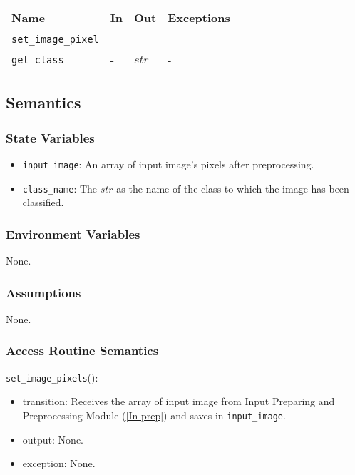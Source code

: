 \documentclass[12pt, titlepage]{article}
\def\code#1{\texttt{#1}}
\begin{document}
\begin{center}
\begin{tabular}{p{3cm} p{4cm} p{4cm} p{2cm}}
\hline
\textbf{Name} & \textbf{In} & \textbf{Out} & \textbf{Exceptions} \\
\hline
\code{set\_image\_pixel} & - & - & - \\
\code{get\_class} & - & $str$&  -\\
\hline
\end{tabular}
\end{center}

\subsection{Semantics}

\subsubsection{State Variables}
\begin{itemize}
  \item \code{input\_image}: An array of input image's pixels after preprocessing.
  \item \code{class\_name}: The $str$ as the name of the class to which the image has been classified.
\end{itemize}

\subsubsection{Environment Variables}
None.

\subsubsection{Assumptions}
None.

\subsubsection{Access Routine Semantics}

\noindent \code{set\_image\_pixels}():
\begin{itemize}
  \item transition: Receives the array of input image from Input Preparing and Preprocessing Module (\ref{In-prep}) 
  and saves in \code{input\_image}.
  \item output: None.
  \item exception: None.
\end{itemize}
\end{document}
